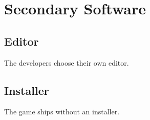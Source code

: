 \chapter{Secondary Software}
\section{Editor}
The developers choose their own editor.
\section{Installer}
The game ships without an installer.
